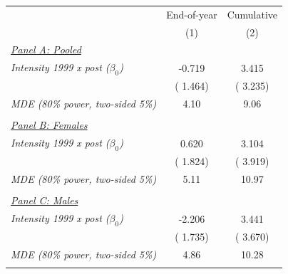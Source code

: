 \begin{tabular}{lcc} \hline \hline
& \multicolumn{1}{c}{End-of-year} & \multicolumn{1}{c}{Cumulative} \\ 
& \multicolumn{1}{c}{(1)} & \multicolumn{1}{c}{(2)} \\ \toprule
\underline{\textit{Panel A: Pooled}} \\ 
\textit{Intensity 1999 x post ($\beta_0$)} &       -0.719 &        3.415 \\ 
  & (       1.464) & (       3.235) \\ 
\textit{MDE (80\% power, two-sided 5\%)} &         4.10 &         9.06 \\ 
  & & \\ 
\underline{\textit{Panel B: Females}} \\ 
\textit{Intensity 1999 x post ($\beta_0$)} &        0.620 &        3.104 \\ 
  & (       1.824) & (       3.919) \\ 
\textit{MDE (80\% power, two-sided 5\%)} &         5.11 &        10.97 \\ 
  & & \\ 
\underline{\textit{Panel C: Males}} \\ 
\textit{Intensity 1999 x post ($\beta_0$)} &       -2.206 &        3.441 \\ 
  & (       1.735) & (       3.670) \\ 
\textit{MDE (80\% power, two-sided 5\%)} &         4.86 &        10.28 \\ 
  & & \\ 
\bottomrule
\end{tabular}